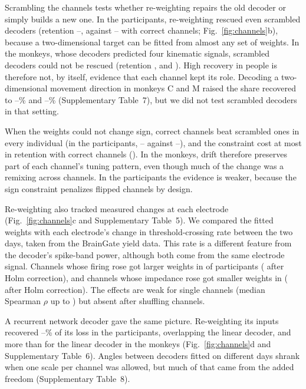 \documentclass{iopjournal}
\begin{document}
Scrambling the channels tests whether re-weighting repairs the old decoder or simply builds a new one. In the
participants, re-weighting rescued even scrambled decoders (retention --,
against -- with correct channels; Fig.~\ref{fig:channels}b), because a
two-dimensional target can be fitted from almost any set of weights. In the monkeys, whose decoders predicted four
kinematic signals, scrambled decoders could not be rescued (retention ,  and
). High recovery in people is therefore not, by itself, evidence that each channel kept its role.
Decoding a two-dimensional movement direction in monkeys C and M raised the share recovered to
--\% and --\% (Supplementary Table~7), but we
did not test scrambled decoders in that setting.

When the weights could not change sign, correct channels beat scrambled ones in every individual (in the participants,
-- against
--), and the constraint cost at most
 in retention with correct channels (). In the monkeys, drift
therefore preserves part of each channel's tuning pattern, even though much of the change was a remixing across
channels. In the participants the evidence is weaker, because the sign
constraint penalizes flipped channels by design.

Re-weighting also tracked measured changes at each electrode (Fig.~\ref{fig:channels}c and Supplementary Table~5). We
compared the fitted weights with each electrode's change in threshold-crossing rate between the two days, taken from the
BrainGate yield data. This rate is a different feature from the decoder's spike-band power, although both come from the
same electrode signal. Channels whose firing rose got larger weights in  of
 participants ( after Holm correction), and channels whose
impedance rose got smaller weights in  ( after Holm correction).
The effects are weak for single channels (median Spearman $\rho$ up to ) but absent after
shuffling channels.

A recurrent network decoder gave the same picture. Re-weighting its inputs recovered
--\% of its loss in the participants, overlapping the linear decoder, and more
than for the linear decoder in the monkeys (Fig.~\ref{fig:channels}d and Supplementary Table~6). Angles between decoders
fitted on different days shrank when one scale per channel was allowed, but much of that came from the added freedom
(Supplementary Table~8).
\end{document}
